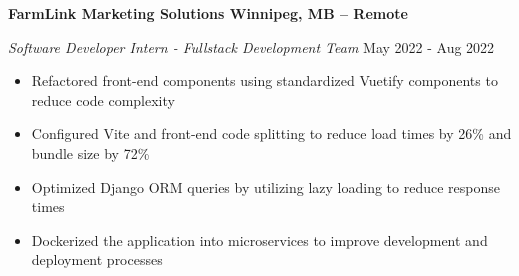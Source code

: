 \textbf{FarmLink Marketing Solutions \hfill Winnipeg, MB -- Remote}\par
\textit{Software Developer Intern - Fullstack Development Team} \hfill May 2022 - Aug 2022

\begin{itemize}
    \item Refactored front-end components using standardized Vuetify components to reduce code complexity
    \item Configured Vite and front-end code splitting to reduce load times by 26\% and bundle size by 72\%
    \item Optimized Django ORM queries by utilizing lazy loading to reduce response times
    \item Dockerized the application into microservices to improve development and deployment processes
\end{itemize}
\vspace{0.2cm} \par
